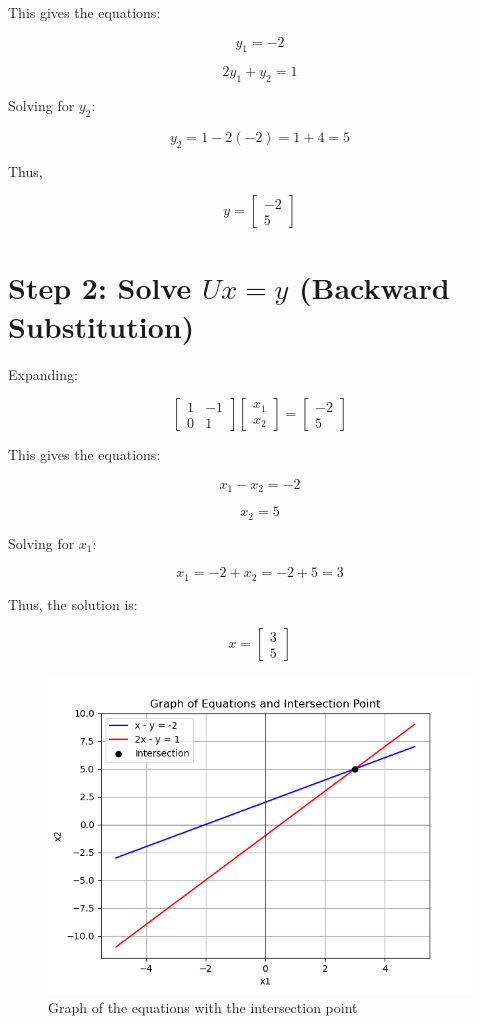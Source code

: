 \documentclass[journal]{IEEEtran}
\begin{document}
This gives the equations:

\[
y_1 = -2
\]

\[
2y_1 + y_2 = 1
\]

Solving for $ y_2 $:

\[
y_2 = 1 - 2(-2) = 1 + 4 = 5
\]

Thus, 

\[
y =
\begin{bmatrix}
-2 \\
5
\end{bmatrix}
\]

\section*{Step 2: Solve $ Ux = y $ (Backward Substitution)}

Expanding:

\[
\begin{bmatrix}
1 & -1 \\
0 & 1
\end{bmatrix}
\begin{bmatrix}
x_1 \\
x_2
\end{bmatrix}
=
\begin{bmatrix}
-2 \\
5
\end{bmatrix}
\]

This gives the equations:

\[
x_1 - x_2 = -2
\]

\[
x_2 = 5
\]

Solving for $ x_1 $:

\[
x_1 = -2 + x_2 = -2 + 5 = 3
\]

Thus, the solution is:

\[
x =
\begin{bmatrix}
3 \\
5
\end{bmatrix}
\]

\begin{figure}[h]
    \centering
    \includegraphics[width=0.8\columnwidth]{figs/lu.png}
    \caption{Graph of the equations with the intersection point}
    \label{fig:intersection}
\end{figure}
\end{document}
